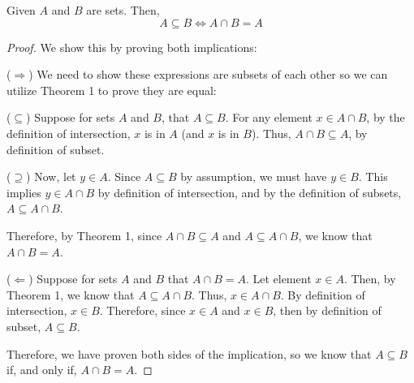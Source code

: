 \begin{exercise}
    {}Given \(A\) and \(B\) are sets. Then, \[A\subseteq B \iff A \cap B = A\]
\end{exercise}



\begin{customframedproof}[linecolor=orangehdx]
    \begin{proof}
    We show this by proving both implications:
        \begin{proofpart}[orangehdx]{(\(\Rightarrow\))}
                We need to show these expressions are subsets of each other so we can utilize Theorem 1 to prove they are equal: 
                \begin{proofpart}[orangehdx]{(\(\subseteq\))}
                    Suppose for sets \(A\) and \(B\), that \(A\subseteq B\). For any element \(x \in A\cap B\), by the definition of intersection, \(x\) is in \(A\) (and \(x\) is in \(B\)). Thus, \(A\cap B \subseteq A\), by definition of subset. 
                \end{proofpart}
                \begin{proofpart}[orangehdx]{(\(\supseteq\))}
                    Now, let \(y\in A\). Since \(A\subseteq B\) by assumption, we must have \(y\in B\). This implies \(y\in A \cap B\) by definition of intersection, and by the definition of subsets, \(A \subseteq A\cap B\).
                \end{proofpart}
                Therefore, by Theorem 1, since \(A\cap B\subseteq A\) and \(A\subseteq A\cap B\), we know that \(A\cap B = A\).
        \end{proofpart}
        \begin{proofpart}[orangehdx]{(\(\Leftarrow\))}
            Suppose for sets \(A\) and \(B\) that \(A \cap B = A\). Let element \(x\in A\). Then, by Theorem 1, we know that \(A \subseteq A\cap B\). Thus, \(x\in A \cap B\). By definition of intersection, \(x \in B\). Therefore, since \(x\in A\) and \(x\in B\), then by definition of subset, \(A\subseteq B\).
        \end{proofpart}
        Therefore, we have proven both sides of the implication, so we know that \(A\subseteq B\) if, and only if, \(A \cap B = A\).
    \end{proof}
\end{customframedproof}
